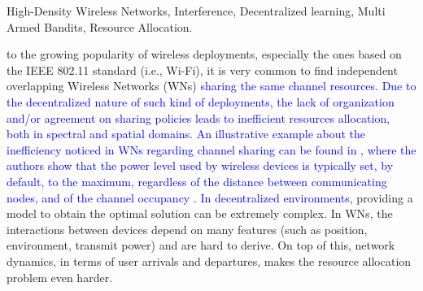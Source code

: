 \documentclass[10pt,journal,compsoc]{IEEEtran}
\newcommand{\francesc}[1]{\textcolor{blue}{#1}}
\begin{document}
{		%
		\begin{IEEEkeywords}
			High-Density Wireless Networks, Interference, Decentralized learning, Multi Armed Bandits, Resource Allocation.
		\end{IEEEkeywords}}
	
	\maketitle
	
	\IEEEdisplaynontitleabstractindextext
	
	\IEEEpeerreviewmaketitle
	
	
	 to the growing popularity of wireless deployments, especially the ones based on the IEEE 802.11 standard (i.e., Wi-Fi), it is very common to find independent overlapping Wireless Networks (WNs) \francesc{sharing the same channel resources. Due to the decentralized nature of such kind of deployments, the lack of organization and/or agreement on sharing policies leads to inefficient resources allocation, both in spectral and spatial domains. An illustrative example about the inefficiency noticed in WNs regarding channel sharing can be found in \cite{akella2007self}, where the authors show that the power level used by wireless devices is typically set, by default, to the maximum, regardless of the distance between communicating nodes, and of the channel occupancy \cite{akella2007self}. In decentralized environments}, providing a model to obtain the optimal solution can be extremely complex. In WNs, the interactions between devices depend on many features (such as position, environment, transmit power) and are hard to derive. On top of this, network dynamics, in terms of user arrivals and departures, makes the resource allocation problem even harder. 
	
\end{document}
